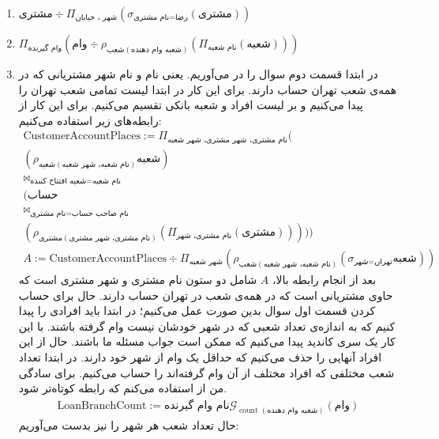 \begin{enumerate}
    \item $\text{مشتری} \div \Pi_{\text{شهر ، خیابان}}(\sigma_{\text{نام مشتری} = \text{رضا}}(\text{مشتری}))$
    \item $\Pi_{\text{وام گیرنده}}(\text{وام} \div \rho_{\text{شعب}(\text{شعبه وام دهنده})} (\Pi_{\text{نام شعبه}}(\text{شعبه})))$
    \item در ابتدا قسمت دوم سوال را در می‌آوریم. یعنی نام و نام شهر مشتریانی که در همه‌ی شعب تهران حساب دارند.
    برای این کار در ابتدا لیست تمامی شعب تهران را پیدا می‌کنیم و بر لیست افراد و شعبه بانکی تقسیم می‌کنیم.
    برای این کار از رابطه‌های زیر استفاده می‌کنیم:
    \begin{gather*}
        \text{CustomerAccountPlaces} := \Pi_{\text{نام مشتری، شهر مشتری، شهر شعبه}}(
        \\
        (\rho_{\text{شعبه}(\text{نام شعبه، شهر شعبه})}\text{شعبه})
        \\
        \bowtie_{\text{شعبه افتتاح کننده}=\text{نام شعبه}}
        \\
        (\text{حساب}
        \\
        \bowtie_{\text{نام مشتری}=\text{نام صاحب حساب}}
        \\(\rho_{\text{مشتری}(\text{نام مشتری، شهر مشتری})}(\Pi_{\text{نام مشتری، شهر}}(\text{مشتری})))))
        \\
        A := \text{CustomerAccountPlaces} \div \Pi_{\text{شهر شعبه}}(\rho_{\text{شعب}(\text{نام شعبه، شهر شعبه})}(\sigma_{\text{شهر}=\text{تهران}}\text{شعبه}))
    \end{gather*}
    بعد از انجام رابطه بالا،
    $A$
    شامل دو ستون نام مشتری و شهر مشتری است که حاوی مشتریانی است که در همه‌ی شعب در تهران حساب دارند.
    حال برای حساب کردن قسمت اول سوال بدین صورت عمل می‌کنیم؛ در ابتدا باید افرادی را پیدا کنیم که به اندازه‌ی
    تعداد شعبی که در شهر خودشان نیست وام گرفته باشند. با این کار یک سری کاندید پیدا می‌کنیم که ممکن است
    جواب مسئله ما باشند. حال از این افراد آنهایی را حذف می‌کنیم که حداقل یک وام از شهر خود دارند.
    در ابتدا تعداد شعب مختلفی که افراد مختلف از آن وام گرفته‌اند را حساب می‌کنیم.
    برای سادگی من از
    استفاده می‌کنم که رابطه کوتاه‌تر شود.
    \begin{gather*}
        \text{LoanBranchCount} := \text{نام وام گیرنده} \mathcal{G}_{\operatorname{count}(\text{شعبه وام دهنده})}(\text{وام})
    \end{gather*}
    حال تعداد شعب هر شهر را نیز بدست می‌آوریم:
    \begin{gather*}

\end{gather*}
\end{enumerate}
